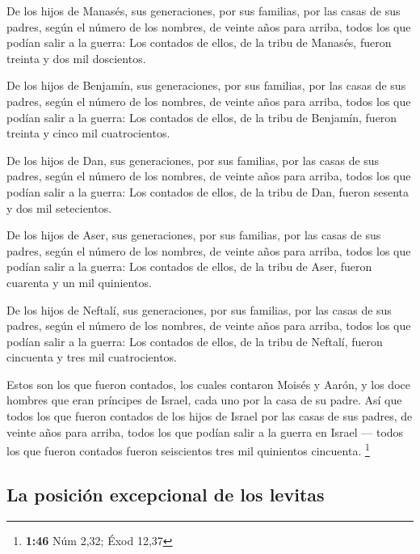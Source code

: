  De los hijos de Manasés, sus generaciones, por sus
familias, por las casas de sus padres, según el número de los nombres,
de veinte años para arriba, todos los que podían salir a la guerra:
 Los contados de ellos, de la tribu de Manasés, fueron
treinta y dos mil doscientos.

 De los hijos de Benjamín, sus generaciones, por sus
familias, por las casas de sus padres, según el número de los nombres,
de veinte años para arriba, todos los que podían salir a la guerra:
 Los contados de ellos, de la tribu de Benjamín, fueron
treinta y cinco mil cuatrocientos.

 De los hijos de Dan, sus generaciones, por sus familias,
por las casas de sus padres, según el número de los nombres, de veinte
años para arriba, todos los que podían salir a la guerra:
 Los contados de ellos, de la tribu de Dan, fueron
sesenta y dos mil setecientos.

 De los hijos de Aser, sus generaciones, por sus
familias, por las casas de sus padres, según el número de los nombres,
de veinte años para arriba, todos los que podían salir a la guerra:
 Los contados de ellos, de la tribu de Aser, fueron
cuarenta y un mil quinientos.

 De los hijos de Neftalí, sus generaciones, por sus
familias, por las casas de sus padres, según el número de los nombres,
de veinte años para arriba, todos los que podían salir a la guerra:
 Los contados de ellos, de la tribu de Neftalí, fueron
cincuenta y tres mil cuatrocientos.

 Estos son los que fueron contados, los cuales contaron
Moisés y Aarón, y los doce hombres que eran príncipes de Israel, cada
uno por la casa de su padre.  Así que todos los que
fueron contados de los hijos de Israel por las casas de sus padres, de
veinte años para arriba, todos los que podían salir a la guerra en
Israel ---  todos los que fueron contados fueron
seiscientos tres mil quinientos cincuenta. \footnote{\textbf{1:46} Núm
  2,32; Éxod 12,37}

\hypertarget{la-posiciuxf3n-excepcional-de-los-levitas}{%
\subsection{La posición excepcional de los
levitas}\label{la-posiciuxf3n-excepcional-de-los-levitas}}

